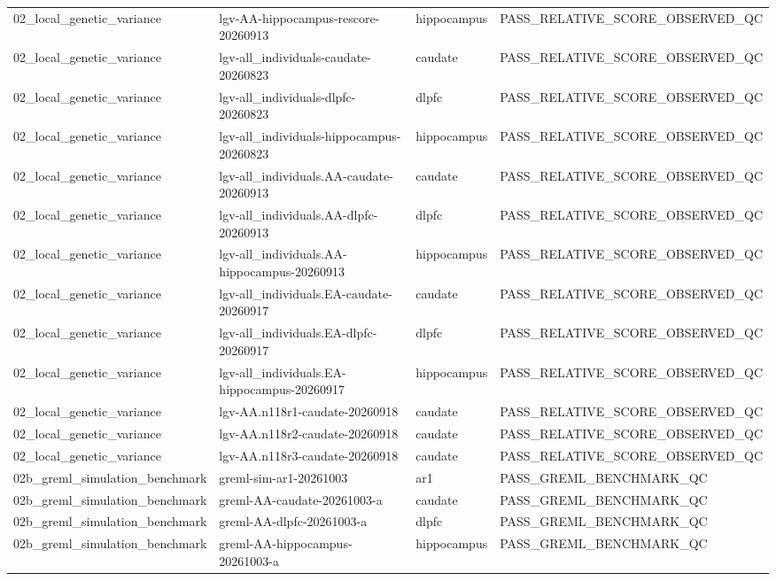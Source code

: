 \begin{tabular}{llll}
02\_local\_genetic\_variance & lgv-AA-hippocampus-rescore-20260913 & hippocampus & PASS\_RELATIVE\_SCORE\_OBSERVED\_QC \\
02\_local\_genetic\_variance & lgv-all\_individuals-caudate-20260823 & caudate & PASS\_RELATIVE\_SCORE\_OBSERVED\_QC \\
02\_local\_genetic\_variance & lgv-all\_individuals-dlpfc-20260823 & dlpfc & PASS\_RELATIVE\_SCORE\_OBSERVED\_QC \\
02\_local\_genetic\_variance & lgv-all\_individuals-hippocampus-20260823 & hippocampus & PASS\_RELATIVE\_SCORE\_OBSERVED\_QC \\
02\_local\_genetic\_variance & lgv-all\_individuals.AA-caudate-20260913 & caudate & PASS\_RELATIVE\_SCORE\_OBSERVED\_QC \\
02\_local\_genetic\_variance & lgv-all\_individuals.AA-dlpfc-20260913 & dlpfc & PASS\_RELATIVE\_SCORE\_OBSERVED\_QC \\
02\_local\_genetic\_variance & lgv-all\_individuals.AA-hippocampus-20260913 & hippocampus & PASS\_RELATIVE\_SCORE\_OBSERVED\_QC \\
02\_local\_genetic\_variance & lgv-all\_individuals.EA-caudate-20260917 & caudate & PASS\_RELATIVE\_SCORE\_OBSERVED\_QC \\
02\_local\_genetic\_variance & lgv-all\_individuals.EA-dlpfc-20260917 & dlpfc & PASS\_RELATIVE\_SCORE\_OBSERVED\_QC \\
02\_local\_genetic\_variance & lgv-all\_individuals.EA-hippocampus-20260917 & hippocampus & PASS\_RELATIVE\_SCORE\_OBSERVED\_QC \\
02\_local\_genetic\_variance & lgv-AA.n118r1-caudate-20260918 & caudate & PASS\_RELATIVE\_SCORE\_OBSERVED\_QC \\
02\_local\_genetic\_variance & lgv-AA.n118r2-caudate-20260918 & caudate & PASS\_RELATIVE\_SCORE\_OBSERVED\_QC \\
02\_local\_genetic\_variance & lgv-AA.n118r3-caudate-20260918 & caudate & PASS\_RELATIVE\_SCORE\_OBSERVED\_QC \\
02b\_greml\_simulation\_benchmark & greml-sim-ar1-20261003 & ar1 & PASS\_GREML\_BENCHMARK\_QC \\
02b\_greml\_simulation\_benchmark & greml-AA-caudate-20261003-a & caudate & PASS\_GREML\_BENCHMARK\_QC \\
02b\_greml\_simulation\_benchmark & greml-AA-dlpfc-20261003-a & dlpfc & PASS\_GREML\_BENCHMARK\_QC \\
02b\_greml\_simulation\_benchmark & greml-AA-hippocampus-20261003-a & hippocampus & PASS\_GREML\_BENCHMARK\_QC \\

\end{tabular}
